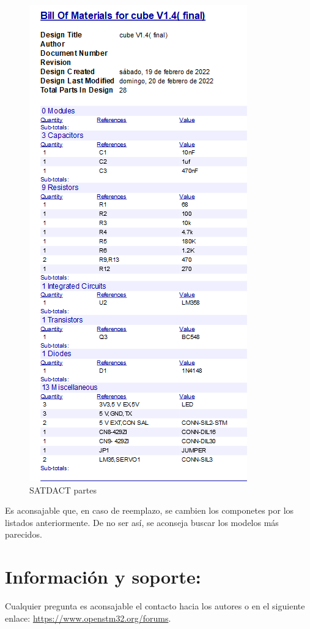 \documentclass[conference]{IEEEtran}
\begin{document}
\begin{figure}[htbp]
\centering
\includegraphics[width=.9\linewidth]{../../images/cuboBOM.png}
\caption{\label{fig:cuboBOM}SATDACT partes}
\end{figure}

Es aconsajable que, en caso de reemplazo, se cambien los componetes por los listados anteriormente. De no ser así, se aconseja buscar los modelos más parecidos.
\section{Información y soporte:}
\label{sec:orgb8b5b1a}
Cualquier pregunta es aconsajable el contacto hacia los autores o en el siguiente enlace: \url{https://www.openstm32.org/forums}.
\end{document}
